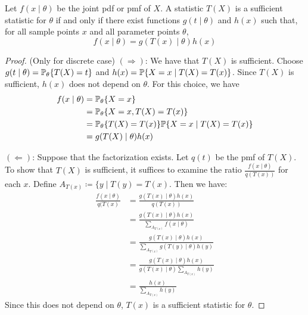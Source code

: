 \documentclass[10pt]{article}
\begin{document}
\begin{theorem}
	 Let $f(x \mid \theta)$ be the joint pdf or pmf of $X$. A statistic $T(X)$ is a sufficient statistic for $\theta$ if and only if there exist functions $g(t \mid \theta)$ and $h(x)$ such that, for all sample points $x$ and all parameter points $\theta$,
	\[
	f(x \mid \theta) = g(T(x) \mid \theta) h(x)
	\]
\end{theorem}
\begin{proof}
	(Only for discrete case)
	$(\Rightarrow)$: We have that $T(X)$ is sufficient. Choose $g(t \mid \theta) = \mathbb{P}_\theta\{T(X) = t\}$ and $h(x) = \mathbb{P}\{X = x \mid T(X) = T(x)\}$. Since $T(X)$ is sufficient, $h(x)$ does not depend on $\theta$. For this choice, we have
	\begin{align*}
		f(x \mid \theta) &= \mathbb{P}_\theta\{X = x\} \\
		&= \mathbb{P}_\theta\{X = x, T(X) = T(x)\} \\
		&= \mathbb{P}_\theta\{T(X) = T(x)\} \mathbb{P}\{X = x \mid T(X) = T(x)\} \\
		&= g(T(X) \mid \theta) h(x)
	\end{align*}
	
	$(\Leftarrow)$: Suppose that the factorization exists. Let $q(t)$ be the pmf of $T(X)$. To show that $T(X)$ is sufficient, it suffices to examine the ratio $\frac{f(x \mid \theta)}{q(T(x))}$ for each $x$. Define $A_{T(x)} \coloneqq \{y \mid T(y) = T(x)$. Then we have:
	\begin{align*}
		\frac{f(x \mid \theta)}{q(T(x)} &= \frac{g(T(x) \mid \theta) h(x)}{q(T(x))} \\
		&= \frac{g(T(x) \mid \theta) h(x)}{\sum_{A_{T(x)}} f(x \mid \theta)} \\
		&= \frac{g(T(x) \mid \theta) h(x)}{\sum_{A_{T(x)}} g(T(y) \mid \theta) h(y)} \\
		&= \frac{g(T(x) \mid \theta) h(x)}{g(T(x) \mid \theta)\sum_{A_{T(x)}}  h(y)} \\
		&= \frac{h(x)}{\sum_{A_{T(x)}}  h(y)}
	\end{align*}
	Since this does not depend on $\theta$, $T(x)$ is a sufficient statistic for $\theta$.
\end{proof}
\end{document}

